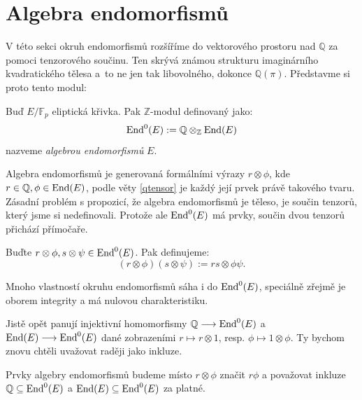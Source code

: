 \documentclass[12pt]{report}
\begin{document}
\section{Algebra endomorfismů}

V této sekci okruh endomorfismů rozšíříme do vektorového prostoru nad $\mathbb{Q}$ za pomoci tenzorového součinu. Ten skrývá známou strukturu imaginárního kvadratického tělesa a~to ne jen tak libovolného, dokonce $\mathbb{Q}(\pi)$. Představme si proto tento modul:

\begin{definice}
Buď $E/\mathbb{F}_p$ eliptická křivka. Pak $\mathbb{Z}$-modul definovaný jako:
\begin{equation*}
\operatorname{End}^0 (E) := \mathbb{Q} \otimes_{\mathbb{Z}} \operatorname{End}(E)
\end{equation*}
nazveme \textit{algebrou endomorfismů} $E$.
\end{definice}

Algebra endomorfismů je generovaná formálními výrazy $r \otimes \phi$, kde $r \in \mathbb{Q}, \phi \in \operatorname{End}(E)$, podle věty \ref{qtensor} je každý její prvek právě takového tvaru. Zásadní problém s propozicí, že algebra endomorfismů je těleso, je součin tenzorů, který jsme si nedefinovali. Protože ale $\operatorname{End}^0 (E)$ má  prvky, součin dvou tenzorů přichází přímočaře.
\begin{definice}
Buďte $r \otimes \phi, s \otimes \psi \in \operatorname{End}^0(E)$. Pak definujeme:
\begin{equation*}
(r \otimes \phi) (s \otimes \psi) := rs \otimes \phi \psi.
\end{equation*} 
\end{definice}

Mnoho vlastností okruhu endomorfismů sáha i do $\operatorname{End}^0 (E)$, speciálně zřejmě je oborem integrity a má nulovou charakteristiku.

Jistě opět panují injektivní homomorfismy $\mathbb{Q} \longrightarrow \operatorname{End}^0 (E)$ a $\operatorname{End}(E) \longrightarrow \operatorname{End}^0 (E)$ dané zobrazeními $r \mapsto r \otimes 1$, resp. $\phi \mapsto 1 \otimes \phi$. Ty bychom znovu chtěli uvažovat raději jako inkluze.

\begin{umluva}
Prvky algebry endomorfismů budeme místo $r \otimes \phi$ značit $r \phi$ a považovat inkluze $\mathbb{Q} \subseteq \operatorname{End}^0 (E)$ a $\operatorname{End}(E) \subseteq \operatorname{End}^0 (E)$ za platné.
\end{umluva}
\end{document}
